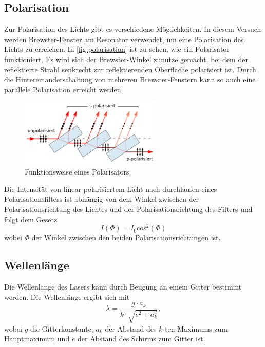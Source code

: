\subsection{Polarisation}\label{sec:polarisation}
Zur Polarisation des Lichts gibt es verschiedene Möglichkeiten. In diesem Versuch werden Brewster-Fenster am Resonator verwendet, um eine Polarisation des Lichts zu erreichen.
In \autoref{fig:polarisation} ist zu sehen, wie ein Polarisator funktioniert. Es wird sich der Brewster-Winkel zunutze gemacht, bei dem der reflektierte Strahl senkrecht zur reflektierenden
Oberfläche polarisiert ist. Durch die Hintereinanderschaltung von mehreren Brewster-Fenstern kann so auch eine parallele Polarisation erreicht werden.
\begin{figure}[H]
    \centering
    \includegraphics[width=0.6\textwidth]{grafiken/brewster.png}
    \caption{Funktionsweise eines Polarisators.\cite{brewster}}
    \label{fig:polarisation}
\end{figure}
\noindent
Die Intensität von linear polarisiertem Licht nach durchlaufen eines Polarisationsfilters ist abhängig von dem Winkel zwischen der Polarisationsrichtung des Lichtes und der Polarisationsrichtung des Filters und folgt dem Gesetz
\begin{equation}
    \label{eqn:pol}
    I\left(\Phi\right) = I_0 \text{cos}^2\left( \Phi \right)
\end{equation}
wobei $\Phi$ der Winkel zwischen den beiden Polarisationsrichtungen ist.
\subsection{Wellenlänge}\label{sec:wellenlaenge}
Die Wellenlänge des Lasers kann durch Beugung an einem Gitter bestimmt werden. Die Wellenlänge ergibt sich mit
\begin{equation*}
    \label{eqn:wel}
    \lambda = \frac{g \cdot a_k}{k \cdot \sqrt{e^2 + a_k^2}},
\end{equation*}
wobei $g$ die Gitterkonstante, $a_k$ der Abstand des $k$-ten Maximums zum Hauptmaximum und $e$ der Abstand des Schirms zum Gitter ist.\\
\newpage
